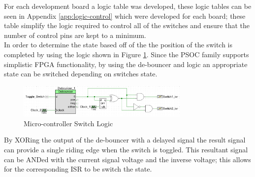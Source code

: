 \documentclass[12pt,openany,a4paper]{book}
\begin{document}
For each development board a logic table was developed, these logic tables can be seen in Appendix \ref{app:logic-control} which were developed for each board; these table simplify the logic required to control all of the switches and ensure that the number of control pins are kept to a minimum.\\[0.2cm]
In order to determine the state based off of the the position of the switch is completed by using the logic shown in Figure \ref{fig:micro-switch-logic}. Since the PSOC family supports simplistic FPGA functionality, by using the de-bouncer and logic an appropriate state can be switched depending on switches state.
\begin{figure}[H]
	\centering
	\includegraphics[width=0.75\textwidth]{micro-switch-logic.png}
	\caption{Micro-controller Switch Logic}
	\label{fig:micro-switch-logic}
\end{figure} 
By XORing the output of the de-bouncer with a delayed signal the result signal can provide a single riding edge when the switch is toggled. This resultant signal can be ANDed with the current signal voltage and the inverse voltage; this allows for the corresponding ISR to be switch the state. 
\end{document}
